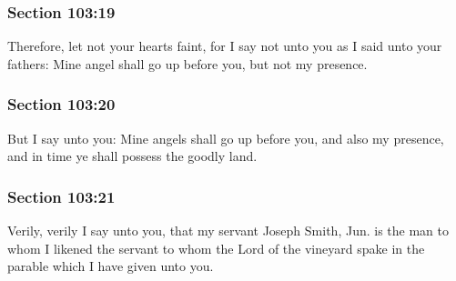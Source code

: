 	\subsubsection{Section 103:19} %
		\label{DC103-19}

		Therefore, let not your hearts faint, for I say not unto you as I said unto your fathers: Mine angel shall go up before you, but not my presence.


	\subsubsection{Section 103:20} %
		\label{DC103-20}

		But I say unto you: Mine angels shall go up before you, and also my presence, and in time ye shall possess the goodly land.


	\subsubsection{Section 103:21} %
		\label{DC103-21}

		Verily, verily I say unto you, that my servant Joseph Smith, Jun. is the man to whom I likened the servant to whom the Lord of the vineyard spake in the parable which I have given unto you.


